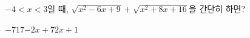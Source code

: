 $-4<x<3$일 때, $\sqrt{x^2-6x+9}+\sqrt{x^2+8x+16}$을 간단히 하면?
\begin{choices32}{$-7$}{$1$}{$7$}{$-2x+7$}{$2x+1$}\end{choices32}
